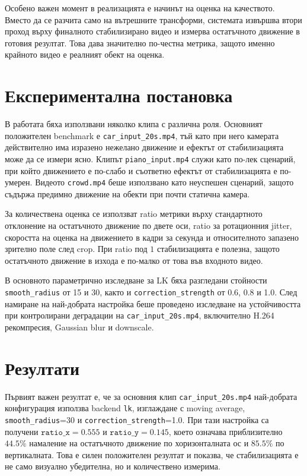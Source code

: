 \documentclass[12pt,a4paper]{article}
\begin{document}
Особено важен момент в реализацията е начинът на оценка на качеството. Вместо да се разчита само на вътрешните трансформи, системата извършва втори проход върху финалното стабилизирано видео и измерва остатъчното движение в готовия резултат. Това дава значително по-честна метрика, защото именно крайното видео е реалният обект на оценка.

\section{Експериментална постановка}
В работата бяха използвани няколко клипа с различна роля. Основният положителен benchmark е \texttt{car\_input\_20s.mp4}, тъй като при него камерата действително има изразено нежелано движение и ефектът от стабилизацията може да се измери ясно. Клипът \texttt{piano\_input.mp4} служи като по-лек сценарий, при който движението е по-слабо и съответно ефектът от стабилизацията е по-умерен. Видеото \texttt{crowd.mp4} беше използвано като неуспешен сценарий, защото съдържа предимно движение на обекти при почти статична камера.

За количествена оценка се използват ratio метрики върху стандартното отклонение на остатъчното движение по двете оси, ratio за ротационния jitter, скоростта на оценка на движението в кадри за секунда и относителното запазено зрително поле след crop. При ratio под \(1\) стабилизацията е полезна, защото остатъчното движение в изхода е по-малко от това във входното видео.

В основното параметрично изследване за LK бяха разгледани стойности \texttt{smooth\_radius} от 15 и 30, както и \texttt{correction\_strength} от 0.6, 0.8 и 1.0. След намиране на най-добрата настройка беше проведено изследване на устойчивостта при контролирани деградации на \texttt{car\_input\_20s.mp4}, включително H.264 рекомпресия, Gaussian blur и downscale.

\section{Резултати}
Първият важен резултат е, че за основния клип \texttt{car\_input\_20s.mp4} най-добрата конфигурация използва backend \texttt{lk}, изглаждане с moving average, \texttt{smooth\_radius}=30 и \texttt{correction\_strength}=1.0. При тази настройка са получени \(\texttt{ratio\_x}=0.555\) и \(\texttt{ratio\_y}=0.145\), което означава приблизително \(44.5\%\) намаление на остатъчното движение по хоризонталната ос и \(85.5\%\) по вертикалната. Това е силен положителен резултат и показва, че стабилизацията е не само визуално убедителна, но и количествено измерима.
\end{document}
